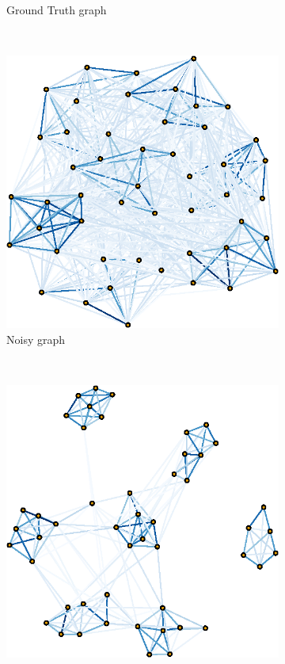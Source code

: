\begin{figure}[!htb]
\begin{subfigure}[b]{0.3\textwidth}
        \caption{Ground Truth graph}
    \end{subfigure}
    ~ %
    \begin{subfigure}[b]{0.3\textwidth}
        \includegraphics[width=\textwidth]{model-mismatch/latex/figures/noisy_graph.eps}
        \caption{Noisy graph}
    \end{subfigure}
    ~ %
    \begin{subfigure}[b]{0.3\textwidth}
        \includegraphics[width=\textwidth]{model-mismatch/latex/figures/est_graph.eps}

\end{subfigure}
\end{figure}
